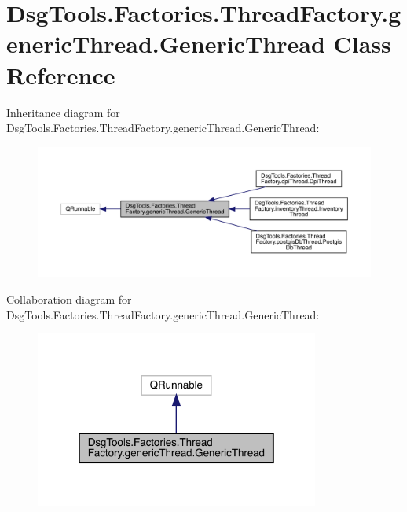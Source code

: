 \hypertarget{class_dsg_tools_1_1_factories_1_1_thread_factory_1_1generic_thread_1_1_generic_thread}{}\section{Dsg\+Tools.\+Factories.\+Thread\+Factory.\+generic\+Thread.\+Generic\+Thread Class Reference}
\label{class_dsg_tools_1_1_factories_1_1_thread_factory_1_1generic_thread_1_1_generic_thread}


Inheritance diagram for Dsg\+Tools.\+Factories.\+Thread\+Factory.\+generic\+Thread.\+Generic\+Thread\+:
\nopagebreak
\begin{figure}[H]
\begin{center}
\leavevmode
\includegraphics[width=350pt]{class_dsg_tools_1_1_factories_1_1_thread_factory_1_1generic_thread_1_1_generic_thread__inherit__graph}
\end{center}
\end{figure}


Collaboration diagram for Dsg\+Tools.\+Factories.\+Thread\+Factory.\+generic\+Thread.\+Generic\+Thread\+:
\nopagebreak
\begin{figure}[H]
\begin{center}
\leavevmode
\includegraphics[width=265pt]{class_dsg_tools_1_1_factories_1_1_thread_factory_1_1generic_thread_1_1_generic_thread__coll__graph}
\end{center}
\end{figure}
